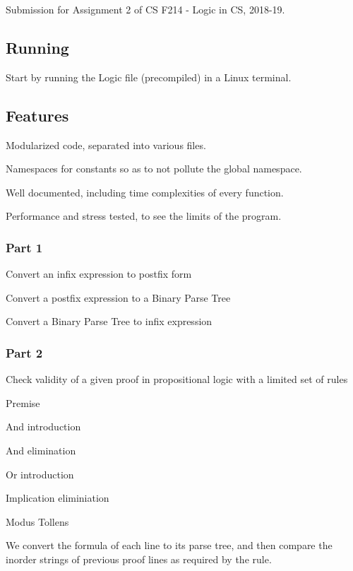 Submission for Assignment 2 of CS F214 -\/ Logic in CS, 2018-\/19.

\subsection*{Running}

Start by running the {\ttfamily Logic} file (precompiled) in a Linux terminal.

\subsection*{Features}


\begin{DoxyItemize}
\item Modularized code, separated into various files.
\item Namespaces for constants so as to not pollute the global namespace.
\item Well documented, including time complexities of every function.
\item Performance and stress tested, to see the limits of the program.
\end{DoxyItemize}

\subsubsection*{Part 1}


\begin{DoxyItemize}
\item Convert an infix expression to postfix form
\item Convert a postfix expression to a Binary Parse Tree
\item Convert a Binary Parse Tree to infix expression
\end{DoxyItemize}

\subsubsection*{Part 2}


\begin{DoxyItemize}
\item Check validity of a given proof in propositional logic with a limited set of rules
\begin{DoxyItemize}
\item Premise
\item And introduction
\item And elimination
\item Or introduction
\item Implication eliminiation
\item Modus Tollens
\end{DoxyItemize}
\item We convert the formula of each line to its parse tree, and then compare the inorder strings of previous proof lines as required by the rule.
\end{DoxyItemize}

